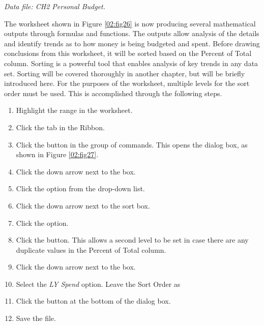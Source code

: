 \textit{Data file: CH2 Personal Budget.}

The  worksheet shown in Figure \ref{02:fig26} is now producing several mathematical outputs through formulas and functions. The outputs allow analysis of the details and identify trends as to how money is being budgeted and spent. Before drawing conclusions from this worksheet, it will be sorted based on the Percent of Total column. Sorting is a powerful tool that enables analysis of key trends in any data set. Sorting will be covered thoroughly in another chapter, but will be briefly introduced here. For the purposes of the  worksheet, multiple levels for the sort order must be used. This is accomplished through the following steps.

\begin{enumerate}
	\item Highlight the range  in the  worksheet.
	\item Click the  tab in the Ribbon.
	\item Click the  button in the  group of commands. This opens the  dialog box, as shown in Figure \ref{02:fig27}.
	\item Click the down arrow next to the  box.
	\item Click the  option from the drop-down list.
	\item Click the down arrow next to the sort  box.
	\item Click the  option.
	\item Click the  button. This allows a second level to be set in case there are any duplicate values in the Percent of Total column.
	\item Click the down arrow next to the  box.
	\item Select the \textit{LY Spend} option. Leave the Sort Order as 
	\item Click the  button at the bottom of the  dialog box.
	\item Save the  file.
\end{enumerate}


